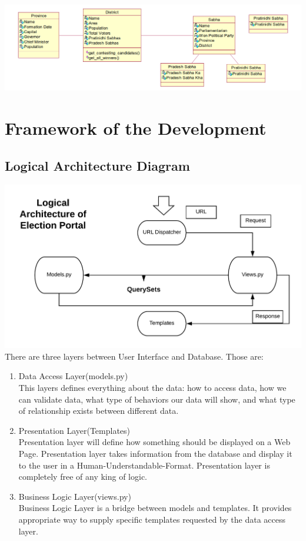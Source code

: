\documentclass[12pt, a4paper, titlepage]{report}
\begin{document}
\begin{center}
\includegraphics[scale=0.5]{Political_division.png}
\end{center}


\section{Framework of the Development}
\subsection{Logical Architecture Diagram}
\includegraphics[scale=0.8]{Logical_Architecture.png}\\
There are three layers between User Interface and Database. Those are:
\begin{enumerate}
\item Data Access Layer(models.py)\\
This layers defines everything about the data: how to access data, how we can validate data, what type of behaviors our data will show, and what type of relationship exists between different data.
\item Presentation Layer(Templates)\\
Presentation layer will define how something should be displayed on a Web Page. Presentation layer takes information from the database and display it to the user in a Human-Understandable-Format. Presentation layer is completely free of any king of logic.
\item Business Logic Layer(views.py)\\
Business Logic Layer is a bridge between models and templates. It provides appropriate way to supply specific templates requested by the data access layer.
\end{enumerate}
\newpage
\end{document}
